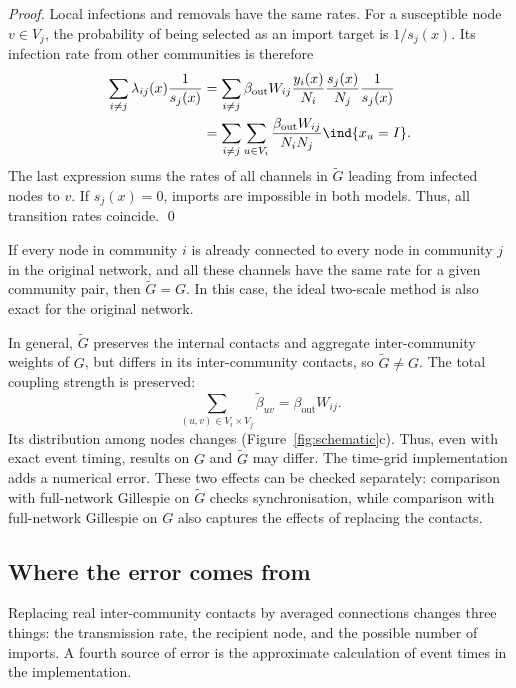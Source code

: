 \begin{proof}
Local infections and removals have the same rates. For a susceptible node $v\in V_j$, the probability of being selected as an import target is $1/s_j(x)$. Its infection rate from other communities is therefore
\[
\begin{aligned}
\sum_{i\neq j}\lambda_{ij}(x)\frac{1}{s_j(x)}
&=\sum_{i\neq j}\beta_{\mathrm{out}}W_{ij}\frac{y_i(x)}{N_i}\frac{s_j(x)}{N_j}\frac{1}{s_j(x)}\\
&=\sum_{i\neq j}\sum_{u\in V_i}\frac{\beta_{\mathrm{out}}W_{ij}}{N_iN_j}\ind\{x_u=I\}.
\end{aligned}
\]
The last expression sums the rates of all channels in $\tilde G$ leading from infected nodes to $v$. If $s_j(x)=0$, imports are impossible in both models. Thus, all transition rates coincide. \qed
\end{proof}

\begin{corollary}
\label{cor:exact}
If every node in community $i$ is already connected to every node in community $j$ in the original network, and all these channels have the same rate for a given community pair, then $\tilde G=G$. In this case, the ideal two-scale method is also exact for the original network.
\end{corollary}

In general, $\tilde G$ preserves the internal contacts and aggregate inter-community weights of $G$, but differs in its inter-community contacts, so $\tilde G\neq G$.
The total coupling strength is preserved:
\[
\sum_{(u,v)\in V_i\times V_j}\tilde\beta_{uv}=\beta_{\mathrm{out}}W_{ij}.
\]
Its distribution among nodes changes (Figure~\ref{fig:schematic}c). Thus, even with exact event timing, results on $G$ and $\tilde G$ may differ. The time-grid implementation adds a numerical error. These two effects can be checked separately: comparison with full-network Gillespie on $\tilde G$ checks synchronisation, while comparison with full-network Gillespie on $G$ also captures the effects of replacing the contacts.

\subsection{Where the error comes from}
\label{sec:sources}

Replacing real inter-community contacts by averaged connections changes three things: the transmission rate, the recipient node, and the possible number of imports. A fourth source of error is the approximate calculation of event times in the implementation.

